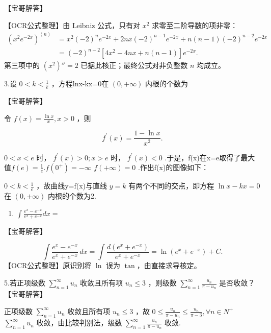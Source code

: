 \documentclass[11pt,fontset=fandol]{ctexart}
\providecommand{\tightlist}{\setlength{\itemsep}{0pt}\setlength{\parskip}{0pt}}
\begin{document}
【宝哥解答】

【OCR公式整理】由 Leibniz 公式，只有对 \(x^2\) 求零至二阶导数的项非零：
\[
\begin{aligned}
(x^2e^{-2x})^{(n)}
&=x^2(-2)^ne^{-2x}+2nx(-2)^{n-1}e^{-2x}
+n(n-1)(-2)^{n-2}e^{-2x}\\
&=(-2)^{n-2}[4x^2-4nx+n(n-1)]e^{-2x}.
\end{aligned}
\] 第三项中的 \((x^2)''=2\) 已据此核正；最终公式对非负整数 \(n\)
均成立。

3.设 \(0 < k < \frac { 1 } { e }\) ，方程lnx-kx=0在 \(( 0 , + \infty )\)
内根的个数为

【宝哥解答】

令 \(f ( x ) = { \frac { \ln x } { x } } , x > 0\) ，则

\[
f ^ { \prime } ( x ) = { \frac { 1 - \ln x } { x ^ { 2 } } } .
\]

\(0 < x < e\) 时， \(f ^ { \prime } ( x ) > 0 ; x > e\) 时，
\(f ^ { \prime } ( x ) < 0\)
.于是，f(x)在x=e取得了最大值\(f ( e ) = { \frac { 1 } { e } } . f ( 0 ^ { + } ) = - \infty\)
\(f ( + \infty ) = 0\) .作出f(x)的图像如下：

\(0 < k < \frac { 1 } { e }\) ，故曲线y=f(x)与直线 \(y = k\)
有两个不同的交点，即方程 \(\ln x - k x = 0\) 在 \(( 0 , + \infty )\)
内根的个数为2.

\begin{enumerate}
\def\labelenumi{\arabic{enumi}.}
\setcounter{enumi}{3}
\tightlist
\item
  \(\int \frac { e ^ { x } - e ^ { - x } } { e ^ { x } + e ^ { - x } } d x =\)
\end{enumerate}

【宝哥解答】

\[
\int\frac{e^x-e^{-x}}{e^x+e^{-x}}\,dx
=\int\frac{d(e^x+e^{-x})}{e^x+e^{-x}}
=\ln(e^x+e^{-x})+C.
\] 【OCR公式整理】原识别将 \(\ln\) 误为 \(\tan\)，由直接求导核定。

5.若正项级数 \(\sum _ { n = 1 } ^ { \infty } u _ { n }\) 收敛且所有项
\(u _ { n } \leq 3\) ，则级数
\(\sum _ { n = 1 } ^ { \infty } \frac { u _ { n } } { \pi - u _ { n } }\)
是否收敛？【宝哥解答】

正项级数 \(\sum _ { n = 1 } ^ { \infty } u _ { n }\) 收敛且所有项
\(u _ { n } \leq 3\) ，故
\(0 \leq \frac { u _ { n } } { \pi - u _ { n } } \leq \frac { u _ { n } } { \pi - 3 } , \forall n \in N ^ { + }\)
\(\sum _ { n = 1 } ^ { \infty } u _ { n }\) 收敛，由比较判别法，级数
\(\sum _ { n = 1 } ^ { \infty } \frac { u _ { n } } { \pi - u _ { n } }\)
收敛.
\end{document}
